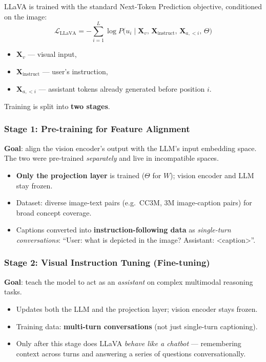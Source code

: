 \documentclass[11pt,a4paper]{article}
\theoremstyle{definition}
\theoremstyle{plain}
\theoremstyle{remark}
\begin{document}
LLaVA is trained with the standard Next-Token Prediction objective, conditioned on the image:
\[
    \mathcal{L}_{\text{LLaVA}} = -\sum_{i=1}^{L} \log P\bigl(u_i \mid \mathbf{X}_v,\, \mathbf{X}_{\text{instruct}},\, \mathbf{X}_{a,<i},\, \Theta\bigr)
\]
\begin{itemize}
    \item $\mathbf{X}_v$ --- visual input,
    \item $\mathbf{X}_{\text{instruct}}$ --- user's instruction,
    \item $\mathbf{X}_{a,<i}$ --- assistant tokens already generated before position $i$.
\end{itemize}

Training is split into \textbf{two stages}.

\subsubsection{Stage 1: Pre-training for Feature Alignment}

\textbf{Goal}: align the vision encoder's output with the LLM's input embedding space. The two were pre-trained \emph{separately} and live in incompatible spaces.

\begin{itemize}
    \item \textbf{Only the projection layer} is trained ($\Theta$ for $W$); vision encoder and LLM stay frozen.
    \item Dataset: diverse image-text pairs (e.g.\ CC3M, 3M image-caption pairs) for broad concept coverage.
    \item Captions converted into \textbf{instruction-following data} as \emph{single-turn conversations}: ``User: what is depicted in the image? Assistant: <caption>''.
\end{itemize}

\subsubsection{Stage 2: Visual Instruction Tuning (Fine-tuning)}

\textbf{Goal}: teach the model to act as an \emph{assistant} on complex multimodal reasoning tasks.

\begin{itemize}
    \item Updates both the LLM and the projection layer; vision encoder stays frozen.
    \item Training data: \textbf{multi-turn conversations} (not just single-turn captioning).
    \item Only after this stage does LLaVA \emph{behave like a chatbot} --- remembering context across turns and answering a series of questions conversationally.
\end{itemize}
\end{document}
